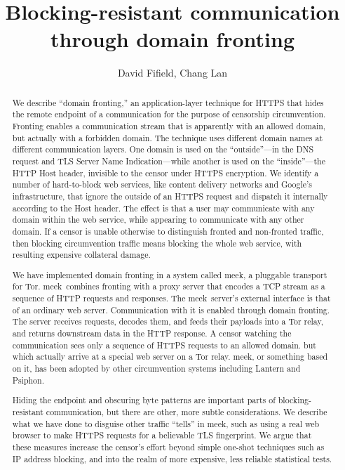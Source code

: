 \documentclass[conference]{IEEEtran}
\def\meek{meek}
\begin{document}
\title{Blocking-resistant communication\\through domain fronting}

\author{David Fifield, Chang Lan}
\author{
}

\maketitle

\begin{abstract}
We describe ``domain fronting,'' an application-layer technique
for HTTPS
that hides the remote endpoint of a communication
for the purpose of censorship circumvention.
Fronting enables a communication stream that is apparently with an allowed domain,
but actually with a forbidden domain.
The technique uses different domain names at different communication layers.
One domain is used on the ``outside''---in the DNS request and
TLS Server Name Indication---while another is used
on the ``inside''---the HTTP Host header, invisible to the
censor under HTTPS encryption.
We identify a number of hard-to-block web services,
like content delivery networks and Google's infrastructure,
that ignore the outside of an HTTPS request
and dispatch it internally according to the Host header.
The effect is that a user may communicate with any domain within the web service,
while appearing to communicate with any other domain.
If a censor is unable otherwise to distinguish fronted and non-fronted traffic,
then blocking circumvention traffic means blocking the whole web service,
with resulting expensive collateral damage.

We have implemented domain fronting in a system called \meek,
a pluggable transport for Tor.
\meek\ combines fronting with a proxy server that encodes a TCP stream
as a sequence of HTTP requests and responses.
The \meek\ server's external interface is that of an ordinary web server.
Communication with it is enabled through domain fronting.
The server receives requests, decodes them, and feeds their payloads into a Tor relay,
and returns downstream data in the HTTP response.
A censor watching the communication sees only a sequence of HTTPS requests to an allowed domain.
but which actually arrive at a special web server on a Tor relay.
\meek, or something based on it,
has been adopted by other circumvention systems including Lantern and Psiphon.

Hiding the endpoint and obscuring byte patterns are important parts of blocking-resistant communication,
but there are other, more subtle considerations.
We describe what we have done to disguise other traffic ``tells'' in \meek,
such as using a real web browser to make HTTPS requests
for a believable TLS fingerprint.
We argue that these measures increase the censor's effort
beyond simple one-shot techniques such as IP address blocking, and into
the realm of more expensive, less reliable statistical tests.
\end{abstract}
\end{document}
